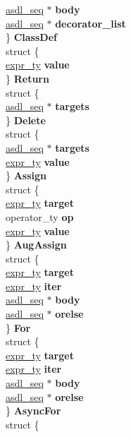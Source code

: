 \begin{DoxyCompactItemize}
\begin{tabbing}
\>\>\hyperlink{structasdl__seq}{asdl\_seq} $\ast$ {\bfseries body}\\
\>\>\hyperlink{structasdl__seq}{asdl\_seq} $\ast$ {\bfseries decorator\_list}\\
\>\} {\bfseries ClassDef}\\
\>struct \{\\
\>\>\hyperlink{struct__expr}{expr\_ty} {\bfseries value}\\
\>\} {\bfseries Return}\\
\>struct \{\\
\>\>\hyperlink{structasdl__seq}{asdl\_seq} $\ast$ {\bfseries targets}\\
\>\} {\bfseries Delete}\\
\>struct \{\\
\>\>\hyperlink{structasdl__seq}{asdl\_seq} $\ast$ {\bfseries targets}\\
\>\>\hyperlink{struct__expr}{expr\_ty} {\bfseries value}\\
\>\} {\bfseries Assign}\\
\>struct \{\\
\>\>\hyperlink{struct__expr}{expr\_ty} {\bfseries target}\\
\>\>operator\_ty {\bfseries op}\\
\>\>\hyperlink{struct__expr}{expr\_ty} {\bfseries value}\\
\>\} {\bfseries AugAssign}\\
\>struct \{\\
\>\>\hyperlink{struct__expr}{expr\_ty} {\bfseries target}\\
\>\>\hyperlink{struct__expr}{expr\_ty} {\bfseries iter}\\
\>\>\hyperlink{structasdl__seq}{asdl\_seq} $\ast$ {\bfseries body}\\
\>\>\hyperlink{structasdl__seq}{asdl\_seq} $\ast$ {\bfseries orelse}\\
\>\} {\bfseries For}\\
\>struct \{\\
\>\>\hyperlink{struct__expr}{expr\_ty} {\bfseries target}\\
\>\>\hyperlink{struct__expr}{expr\_ty} {\bfseries iter}\\
\>\>\hyperlink{structasdl__seq}{asdl\_seq} $\ast$ {\bfseries body}\\
\>\>\hyperlink{structasdl__seq}{asdl\_seq} $\ast$ {\bfseries orelse}\\
\>\} {\bfseries AsyncFor}\\
\>struct \{\\

\end{tabbing}
\end{DoxyCompactItemize}
